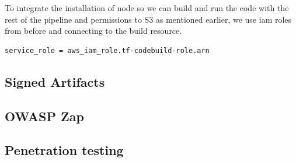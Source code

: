 To integrate the installation of node so we can build and run the code with the rest of the pipeline and permissions to S3 as mentioned earlier, we use \acrshort{iam} roles from before and connecting to the build resource.

\begin{tcolorbox}
\begin{verbatim}
service_role = aws_iam_role.tf-codebuild-role.arn
\end{verbatim}
\end{tcolorbox}


\subsection{Signed Artifacts}


\subsection{OWASP Zap}


\subsection{Penetration testing}



